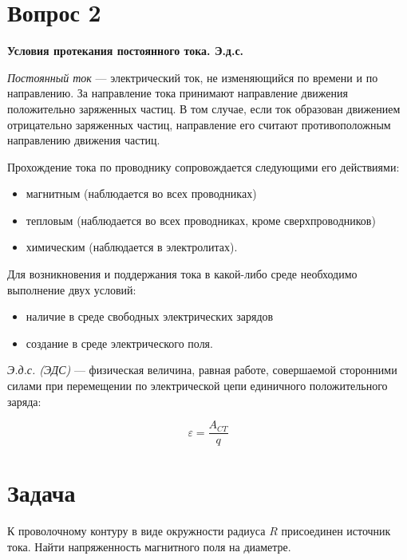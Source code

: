 \newpage

\section*{Вопрос 2}

\textbf{Условия протекания постоянного тока. Э.д.с.}

\textit{Постоянный ток} --- электрический ток, 
не изменяющийся по времени и по направлению. 
За направление тока принимают направление движения положительно заряженных частиц. 
В том случае, если ток образован движением отрицательно заряженных частиц, 
направление его считают противоположным направлению движения частиц.

Прохождение тока по проводнику сопровождается следующими его действиями:

\begin{itemize}
	\item магнитным (наблюдается во всех проводниках)
	\item тепловым (наблюдается во всех проводниках, кроме сверхпроводников)
	\item химическим (наблюдается в электролитах).
\end{itemize}

Для возникновения и поддержания тока в какой-либо среде необходимо выполнение двух условий:

\begin{itemize}
	\item наличие в среде свободных электрических зарядов
	\item создание в среде электрического поля.
\end{itemize}

\textit{Э.д.с. (ЭДС)} --- физическая величина, равная работе, совершаемой сторонними силами при перемещении по электрической цепи единичного положительного заряда:

\begin{equation}
	\varepsilon = \dfrac{A_{CT}}{q}
\end{equation}

\newpage 

\section*{Задача}

К проволочному контуру в виде окружности радиуса $ R $ присоединен источник тока.
Найти напряженность магнитного поля на диаметре.

